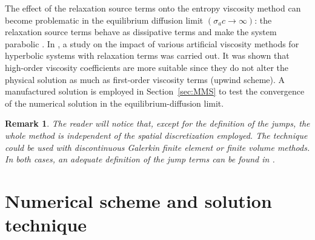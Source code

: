 \documentclass[review]{elsarticle}
\newtheorem{remark}{Remark}[section]
\newcommand{\sect}[1]{Section~\ref{#1}}                     %
\begin{document}
The effect of the relaxation source terms onto the entropy viscosity method can become problematic in the equilibrium diffusion limit $(\sigma_a c \to \infty)$: the relaxation source terms behave as dissipative terms and make the system parabolic \cite{Leveque}. In \cite{ShiJin}, a study on the impact of various artificial viscosity methods for hyperbolic systems with relaxation terms was carried out. It was shown that high-order viscosity coefficients are more suitable since they do not alter the physical solution as much as first-order viscosity terms (upwind scheme). A manufactured  solution is employed in \sect{sec:MMS} to test the convergence of the numerical solution in the equilibrium-diffusion limit.  

 \begin{remark}
The reader will notice that, except for the definition of the jumps, the whole method is independent of the spatial discretization employed. The technique could be used with discontinuous Galerkin finite element or finite volume methods. In both cases, an adequate  definition of the jump terms can be found in \cite{valentin}.
 \end{remark}
%
\section{Numerical scheme and solution technique}
\label{sec:num-scheme}
\end{document}
